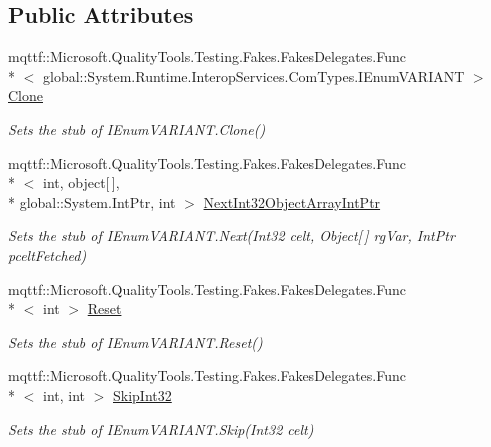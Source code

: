\subsection*{Public Attributes}
\begin{DoxyCompactItemize}
\item 
mqttf\-::\-Microsoft.\-Quality\-Tools.\-Testing.\-Fakes.\-Fakes\-Delegates.\-Func\\*
$<$ global\-::\-System.\-Runtime.\-Interop\-Services.\-Com\-Types.\-I\-Enum\-V\-A\-R\-I\-A\-N\-T $>$ \hyperlink{class_system_1_1_runtime_1_1_interop_services_1_1_com_types_1_1_fakes_1_1_stub_i_enum_v_a_r_i_a_n_t_aab50ee0200a4c377d754ae7105856541}{Clone}
\begin{DoxyCompactList}\small\item\em Sets the stub of I\-Enum\-V\-A\-R\-I\-A\-N\-T.\-Clone()\end{DoxyCompactList}\item 
mqttf\-::\-Microsoft.\-Quality\-Tools.\-Testing.\-Fakes.\-Fakes\-Delegates.\-Func\\*
$<$ int, object\mbox{[}$\,$\mbox{]}, \\*
global\-::\-System.\-Int\-Ptr, int $>$ \hyperlink{class_system_1_1_runtime_1_1_interop_services_1_1_com_types_1_1_fakes_1_1_stub_i_enum_v_a_r_i_a_n_t_aea1acc01b7b1ff19816e33c4cdceee0f}{Next\-Int32\-Object\-Array\-Int\-Ptr}
\begin{DoxyCompactList}\small\item\em Sets the stub of I\-Enum\-V\-A\-R\-I\-A\-N\-T.\-Next(\-Int32 celt, Object\mbox{[}$\,$\mbox{]} rg\-Var, Int\-Ptr pcelt\-Fetched)\end{DoxyCompactList}\item 
mqttf\-::\-Microsoft.\-Quality\-Tools.\-Testing.\-Fakes.\-Fakes\-Delegates.\-Func\\*
$<$ int $>$ \hyperlink{class_system_1_1_runtime_1_1_interop_services_1_1_com_types_1_1_fakes_1_1_stub_i_enum_v_a_r_i_a_n_t_ad6eab99dfc73a9ef18b51ebeb388c678}{Reset}
\begin{DoxyCompactList}\small\item\em Sets the stub of I\-Enum\-V\-A\-R\-I\-A\-N\-T.\-Reset()\end{DoxyCompactList}\item 
mqttf\-::\-Microsoft.\-Quality\-Tools.\-Testing.\-Fakes.\-Fakes\-Delegates.\-Func\\*
$<$ int, int $>$ \hyperlink{class_system_1_1_runtime_1_1_interop_services_1_1_com_types_1_1_fakes_1_1_stub_i_enum_v_a_r_i_a_n_t_af07066a541814d3a8bcbefe66ab959a7}{Skip\-Int32}
\begin{DoxyCompactList}\small\item\em Sets the stub of I\-Enum\-V\-A\-R\-I\-A\-N\-T.\-Skip(\-Int32 celt)\end{DoxyCompactList}\end{DoxyCompactItemize}


